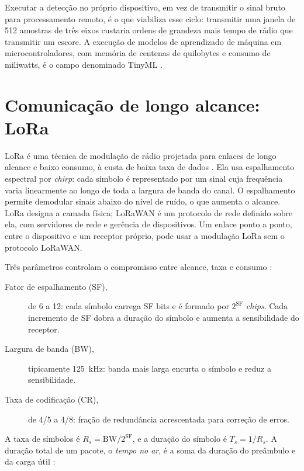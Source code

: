 Executar a detecção no próprio dispositivo, em vez de transmitir o sinal bruto para
processamento remoto, é o que viabiliza esse ciclo: transmitir uma janela de \num{512}
amostras de três eixos custaria ordens de grandeza mais tempo de rádio que transmitir um
escore. A execução de modelos de aprendizado de máquina em microcontroladores, com memória
de centenas de quilobytes e consumo de miliwatts, é o campo denominado TinyML
\cite{antonini2023,barbariol2022}.

\section{Comunicação de longo alcance: LoRa}
\label{sec:fund-lora}

LoRa é uma técnica de modulação de rádio projetada para enlaces de longo alcance e baixo
consumo, à custa de baixa taxa de dados \cite{augustin2016}. Ela usa espalhamento
espectral por \emph{chirp}: cada símbolo é representado por um sinal cuja frequência varia
linearmente ao longo de toda a largura de banda do canal. O espalhamento permite
demodular sinais abaixo do nível de ruído, o que aumenta o alcance. LoRa designa a camada
física; LoRaWAN é um protocolo de rede definido sobre ela, com servidores de rede e
gerência de dispositivos. Um enlace ponto a ponto, entre o dispositivo e um receptor
próprio, pode usar a modulação LoRa sem o protocolo LoRaWAN.

Três parâmetros controlam o compromisso entre alcance, taxa e consumo \cite{semtech2015}:

\begin{description}
  \item[Fator de espalhamento (SF),] de 6 a 12: cada símbolo carrega SF bits e é formado
        por $2^{\mathrm{SF}}$ \emph{chips}. Cada incremento de SF dobra a duração do
        símbolo e aumenta a sensibilidade do receptor.
  \item[Largura de banda (BW),] tipicamente \SI{125}{\kilo\hertz}: banda mais larga
        encurta o símbolo e reduz a sensibilidade.
  \item[Taxa de codificação (CR),] de 4/5 a 4/8: fração de redundância acrescentada para
        correção de erros.
\end{description}

A taxa de símbolos é $R_s = \mathrm{BW}/2^{\mathrm{SF}}$, e a duração do símbolo é
$T_s = 1/R_s$. A duração total de um pacote, o \emph{tempo no ar}, é a soma da duração do
preâmbulo e da carga útil \cite{semtech2015}:

